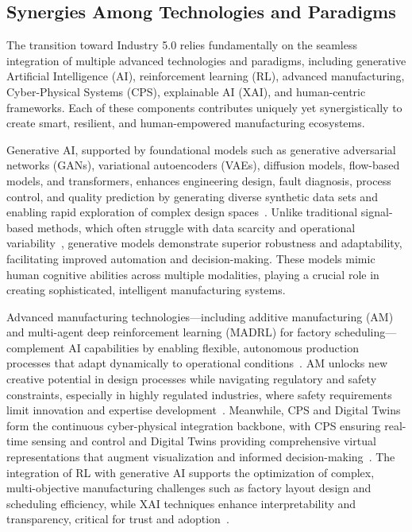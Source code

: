 \documentclass[sigconf]{acmart}
\begin{document}
\subsection{Synergies Among Technologies and Paradigms}

The transition toward Industry 5.0 relies fundamentally on the seamless integration of multiple advanced technologies and paradigms, including generative Artificial Intelligence (AI), reinforcement learning (RL), advanced manufacturing, Cyber-Physical Systems (CPS), explainable AI (XAI), and human-centric frameworks. Each of these components contributes uniquely yet synergistically to create smart, resilient, and human-empowered manufacturing ecosystems.

Generative AI, supported by foundational models such as generative adversarial networks (GANs), variational autoencoders (VAEs), diffusion models, flow-based models, and transformers, enhances engineering design, fault diagnosis, process control, and quality prediction by generating diverse synthetic data sets and enabling rapid exploration of complex design spaces~\cite{ref1}. Unlike traditional signal-based methods, which often struggle with data scarcity and operational variability~\cite{ref4}, generative models demonstrate superior robustness and adaptability, facilitating improved automation and decision-making. These models mimic human cognitive abilities across multiple modalities, playing a crucial role in creating sophisticated, intelligent manufacturing systems.

Advanced manufacturing technologies—including additive manufacturing (AM) and multi-agent deep reinforcement learning (MADRL) for factory scheduling—complement AI capabilities by enabling flexible, autonomous production processes that adapt dynamically to operational conditions~\cite{ref16,ref23}. AM unlocks new creative potential in design processes while navigating regulatory and safety constraints, especially in highly regulated industries, where safety requirements limit innovation and expertise development~\cite{ref16}. Meanwhile, CPS and Digital Twins form the continuous cyber-physical integration backbone, with CPS ensuring real-time sensing and control and Digital Twins providing comprehensive virtual representations that augment visualization and informed decision-making~\cite{ref23}. The integration of RL with generative AI supports the optimization of complex, multi-objective manufacturing challenges such as factory layout design and scheduling efficiency, while XAI techniques enhance interpretability and transparency, critical for trust and adoption~\cite{ref12}.
\end{document}
